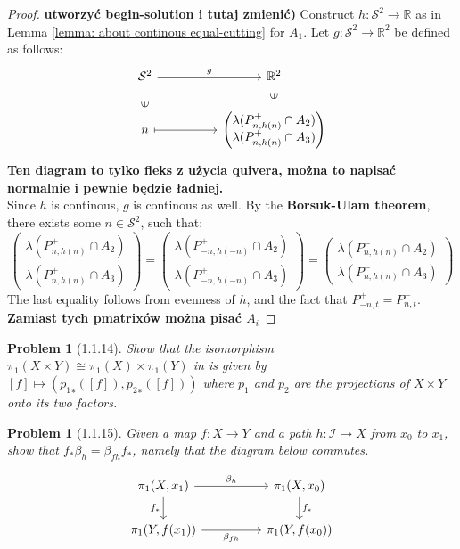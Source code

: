 \documentclass[11pt, a4paper, final]{amsart}
\newcommand{\R}{{\mathbb{R}}}
\newcommand\todo[1]{\textbf{\textcolor{redd}{#1}}}
\newcommand{\unit}{\mathcal{I}}
\newcommand{\sphere}{\mathcal{S}}
\numberwithin{theorem}{section}
\newtheorem{problem}[theorem]{Problem}
\theoremstyle{definition}
\theoremstyle{remark}
\begin{document}
\begin{proof}\todo{utworzyć begin-solution i tutaj zmienić)}
    Construct $h : \sphere^2 \to \R$ as in Lemma \ref{lemma: about continous equal-cutting} for $A_1$.
    Let $g : \sphere^2 \to \R^2$ be defined as follows:
    \[\begin{tikzcd}
	{\sphere^2} && {\R^2} \\
	n && {\begin{pmatrix}
	    \lambda(P^+_{n, h(n)} \cap A_2) \\
        \lambda(P^+_{n, h(n)} \cap A_3)
	\end{pmatrix}}
	\arrow["g", from=1-1, to=1-3]
	\arrow["\in"{marking, allow upside down}, draw=none, from=2-1, to=1-1]
	\arrow[maps to, from=2-1, to=2-3]
	\arrow["\in"{marking, allow upside down}, draw=none, from=2-3, to=1-3]
\end{tikzcd}\]
\todo{Ten diagram to tylko fleks z użycia quivera, można to napisać normalnie i pewnie będzie ładniej.} \\
Since $h$ is continous, $g$ is continous as well. By the \textbf{Borsuk-Ulam theorem}, there exists some $n \in \sphere^2$, such that:
$$\begin{pmatrix}
	    \lambda(P^+_{n, h(n)} \cap A_2) \\
        \lambda(P^+_{n, h(n)} \cap A_3)
	\end{pmatrix} = \begin{pmatrix}
	    \lambda(P^+_{-n, h(-n)} \cap A_2) \\
        \lambda(P^+_{-n, h(-n)} \cap A_3)
	\end{pmatrix} = \begin{pmatrix}
	    \lambda(P^-_{n, h(n)} \cap A_2) \\
        \lambda(P^-_{n, h(n)} \cap A_3)
	\end{pmatrix}$$
    The last equality follows from evenness of $h$, and the fact that $P^+_{-n, t} = P^-_{n, t}$.
    \todo{Zamiast tych pmatrixów można pisać $A_i$}
\end{proof}

\begin{problem}[1.1.14]\label{problem: 1.1.14}
    Show that the isomorphism $\pi_1(X \times Y) \cong \pi_1(X) \times \pi_1(Y)$ in \cite[Proposition 1.12]{AH} is given by $[f] \mapsto ({p_1}_*([f]), {p_2}_*([f]))$ where $p_1$ and $p_2$ are the projections of $X \times Y$ onto its two factors.
\end{problem}

\begin{problem}[1.1.15]\label{problem: 1.1.15}
    Given a map $f:X \rightarrow Y$ and a path $h : \unit \rightarrow X$ from $x_0$ to $x_1$, show that $f_*\beta_h = \beta_{fh}f_*$, namely that the diagram below commutes.

    \[\begin{tikzcd}
	{\pi_1(X, x_1)} && {\pi_1(X, x_0)} \\
	{\pi_1(Y, f(x_1))} && {\pi_1(Y, f(x_0))}
	\arrow["{\beta_h}", from=1-1, to=1-3]
	\arrow["{f_*}"', from=1-1, to=2-1]
	\arrow["{f_*}", from=1-3, to=2-3]
	\arrow["{\beta_{fh}}"', from=2-1, to=2-3]
\end{tikzcd}\]
\end{problem}
\end{document}
